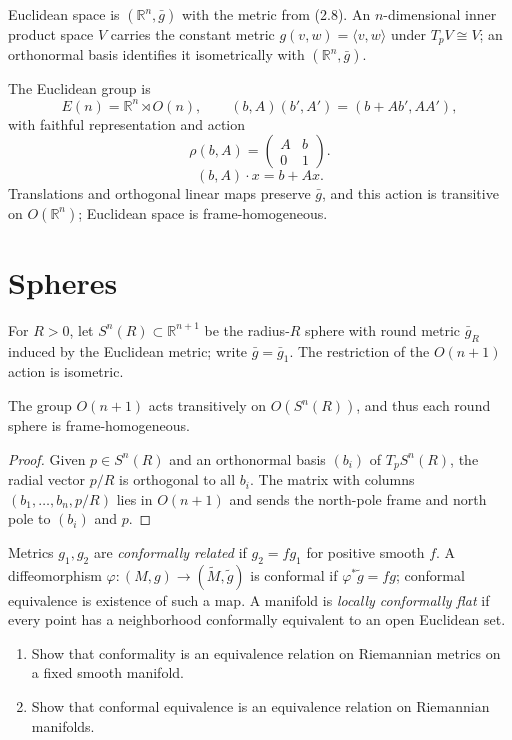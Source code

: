 Euclidean space is $(\mathbb R^n,\bar g)$ with the metric from (2.8). An $n$-dimensional inner product space $V$ carries the constant metric $g(v,w)=\langle v,w\rangle$ under $T_pV\cong V$; an orthonormal basis identifies it isometrically with $(\mathbb R^n,\bar g)$.

The Euclidean group is
\[
E(n)=\mathbb R^n\rtimes O(n),\qquad (b,A)(b',A')=(b+Ab',AA'),
\]
with faithful representation and action
\[
\rho(b,A)=\begin{pmatrix}A&b\\0&1\end{pmatrix}.
\]
\begin{equation}
(b,A)\cdot x=b+Ax.\tag{3.2}
\end{equation}
Translations and orthogonal linear maps preserve $\bar g$, and this action is transitive on $O(\mathbb R^n)$; Euclidean space is frame-homogeneous.

\section{Spheres}

For $R>0$, let $S^n(R)\subset\mathbb R^{n+1}$ be the radius-$R$ sphere with round metric $\bar g_R$ induced by the Euclidean metric; write $\bar g=\bar g_1$. The restriction of the $O(n+1)$ action is isometric.

\begin{proposition}
\label{prop:frame-homogeneous-sphere}
The group $O(n+1)$ acts transitively on $O(S^n(R))$, and thus each round sphere is frame-homogeneous.
\end{proposition}
\begin{proof}
\sketch Given $p\in S^n(R)$ and an orthonormal basis $(b_i)$ of $T_pS^n(R)$, the radial vector $p/R$ is orthogonal to all $b_i$. The matrix with columns $(b_1,\ldots,b_n,p/R)$ lies in $O(n+1)$ and sends the north-pole frame and north pole to $(b_i)$ and $p$.
\end{proof}

Metrics $g_1,g_2$ are \emph{conformally related} if $g_2=fg_1$ for positive smooth $f$. A diffeomorphism $\varphi:(M,g)\to(\widetilde M,\widetilde g)$ is conformal if $\varphi^*\widetilde g=fg$; conformal equivalence is existence of such a map. A manifold is \emph{locally conformally flat} if every point has a neighborhood conformally equivalent to an open Euclidean set.

\begin{exercise}\label{exer:conformality-equivalence-relation}
\begin{enumerate}
\item[(a)] Show that conformality is an equivalence relation on Riemannian metrics on a fixed smooth manifold.
\item[(b)] Show that conformal equivalence is an equivalence relation on Riemannian manifolds.
\end{enumerate}
\end{exercise}

